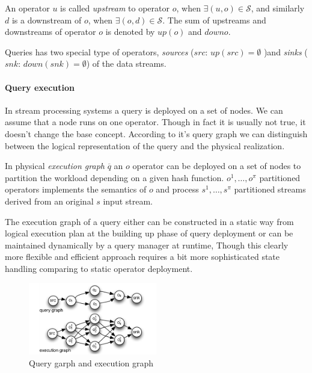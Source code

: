 An operator $u$ is called \textit{upstream} to operator $o$, when $\exists(u,o) \in \mathcal{S}$, and similarly $d$ is a downstream of $o$, when $\exists(o,d) \in \mathcal{S}$. The sum of upstreams and downstreams of operator $o$ is denoted by $up(o)$ and $down{o}$.

Queries has two special type of operators, \textit{sources} ($src$: $up(src)=\emptyset$ )and \textit{sinks} ($snk$: $down(snk)=\emptyset$) of the data streams.\cite{pietzuch:intscaleoutandft}
\paragraph{Query execution} 
In stream processing systems a query is deployed on a set of nodes. We can assume that a node runs on one operator. Though in fact it is usually not true, it doesn't change the base concept. According to it's query graph we can distinguish between the logical representation of the query and the physical realization.

In physical \textit{execution graph} $\overline{q}$ an $o$ operator can be deployed on a set of nodes to partition the workload depending on a given hash function. $o^1,\dots,o^{\pi}$ partitioned operators implements the semantics of $o$ and process $s^1,\dots,s^\pi$ partitioned streams derived from an original $s$ input stream. 

The execution graph of a query either can be constructed in a static way from logical execution plan at the building up phase of query deployment or can be maintained dynamically by a query manager at runtime, Though this clearly more flexible and efficient approach requires a bit more sophisticated state handling comparing to static operator deployment.\cite{pietzuch:intscaleoutandft}
\begin{figure}[!ht]
  \centering    
      \includegraphics[width=0.5\textwidth]{figures/query_exec_graph.png}
  \caption{Query garph and execution graph \cite{pietzuch:intscaleoutandft}}
  \label{fig:gradient_descent_error_surface}
\end{figure} 
